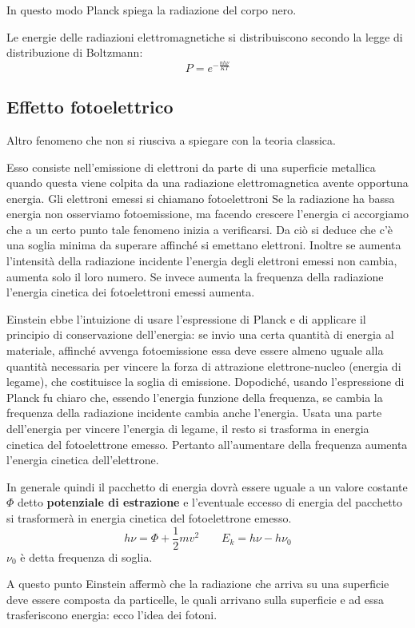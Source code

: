 In questo modo Planck spiega la radiazione del corpo nero.

Le energie delle radiazioni elettromagnetiche si distribuiscono secondo la legge di distribuzione di Boltzmann:
$$P=e^{{-\frac{nh\nu}{KT}}}$$%
\subsection{Effetto fotoelettrico}
Altro fenomeno che non si riusciva a spiegare con la teoria classica.

Esso consiste nell'emissione di elettroni da parte di una superficie metallica quando questa viene colpita da una radiazione elettromagnetica avente opportuna energia. Gli elettroni emessi si chiamano fotoelettroni
Se la radiazione ha bassa energia non osserviamo fotoemissione, ma facendo crescere l'energia ci accorgiamo che a un certo punto tale fenomeno inizia a verificarsi. Da ciò si deduce che c'è una soglia minima da superare affinché si emettano elettroni. Inoltre se aumenta l'intensità della radiazione incidente l'energia degli elettroni emessi non cambia, aumenta solo il loro numero. Se invece aumenta la frequenza della radiazione l'energia cinetica dei fotoelettroni emessi aumenta.

Einstein ebbe l'intuizione di usare l'espressione di Planck e di applicare il principio di conservazione dell'energia: se invio una certa quantità di energia al materiale, affinché avvenga fotoemissione essa deve essere almeno uguale alla quantità necessaria per vincere la forza di attrazione elettrone-nucleo (energia di legame), che costituisce la soglia di emissione. Dopodiché, usando l'espressione di Planck fu chiaro che, essendo l'energia funzione della frequenza, se cambia la frequenza della radiazione incidente cambia anche l'energia. Usata una parte dell'energia per vincere l'energia di legame, il resto si trasforma in energia cinetica del fotoelettrone emesso.
Pertanto all'aumentare della frequenza aumenta l'energia cinetica dell'elettrone.

In generale quindi il pacchetto di energia dovrà essere uguale a un valore costante $\Phi$ detto \textbf{potenziale di estrazione} e l'eventuale eccesso di energia del pacchetto si trasformerà in energia cinetica del fotoelettrone emesso.
$$h\nu=\Phi+\frac{1}{2}mv^2 \qquad E_k=h\nu-h\nu_0$$
$\nu_0$ è detta frequenza di soglia.

A questo punto Einstein affermò che la radiazione che arriva su una superficie deve essere composta da particelle, le quali arrivano sulla superficie e ad essa trasferiscono energia: ecco l'idea dei fotoni.

